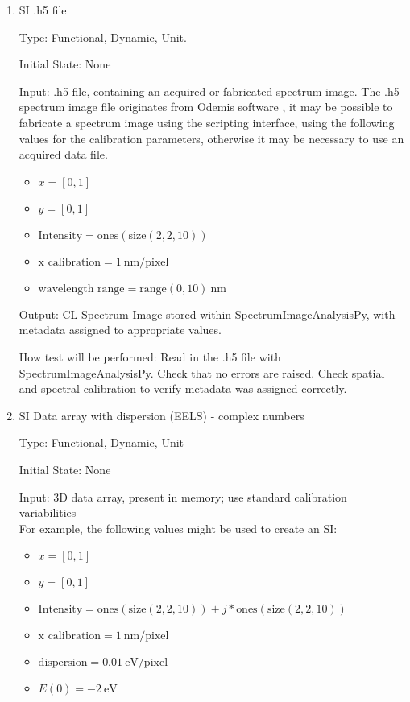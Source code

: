 \documentclass[12pt, titlepage]{article}
\newcommand{\progname}{SpectrumImageAnalysisPy}
\begin{document}
\begin{enumerate}

\item{SI .h5 file}

Type: Functional, Dynamic, Unit.

Initial State: None

Input: .h5 file, containing an acquired or fabricated spectrum image. The .h5
spectrum image file originates from Odemis software \cite{bv_odemis:_nodate}, it
may be possible to fabricate a spectrum image using the scripting interface,
using the following values for the calibration parameters, otherwise it may be
necessary to use an acquired data file.

\begin{itemize}
	\item $x = [0, 1]$
	\item $y = [0, 1]$
	\item $\text{Intensity} = \text{ones}(\text{size}(2,2,10))$
	\item $\text{x calibration} = 1\ \si{\nano\metre}/\text{pixel}$
	\item $\text{wavelength range} = \text{range}(0, 10)\ \si{\nano\metre}$
\end{itemize}

Output: CL Spectrum Image stored within \progname, with metadata assigned to
appropriate values.
					
How test will be performed: Read in the .h5 file with \progname{}. Check that no
errors are raised. Check spatial and spectral calibration to verify metadata was
assigned correctly.

\item{SI Data array with dispersion (EELS) - complex numbers}

Type: Functional, Dynamic, Unit

Initial State: None

Input: 3D data array, present in memory; use standard calibration
variabilities\\
For example, the following values might be used to create an SI: 
\begin{itemize}
	\item $x = [0, 1]$
	\item $y = [0, 1]$
	\item $\text{Intensity} = \text{ones}(\text{size}(2,2,10)) + j *
\text{ones}(\text{size}(2,2,10))$
	\item $\text{x calibration} = 1\ \si{\nano\metre}/\text{pixel}$
	\item $\text{dispersion} = 0.01\ \si{\electronvolt}/\text{pixel}$
	\item $E(0) = -2\ \si{\electronvolt}$
\end{itemize}


\end{enumerate}
\end{document}
